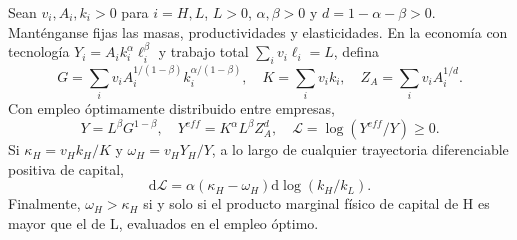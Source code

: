 \begin{lemma}
\label{lem:allocation_loss_identity}
Sean $v_i,A_i,k_i>0$ para $i=H,L$, $L>0$,
$\alpha,\beta>0$ y $d=1-\alpha-\beta>0$.
Manténganse fijas las masas, productividades y elasticidades.
En la economía con tecnología
$Y_i=A_i k_i^\alpha\ell_i^\beta$ y
trabajo total $\sum_i v_i\ell_i=L$, defina
\[
G=\sum_i v_i A_i^{1/(1-\beta)}
k_i^{\alpha/(1-\beta)},\quad
K=\sum_i v_i k_i,\quad Z_A=\sum_i v_iA_i^{1/d}.
\]
Con empleo óptimamente distribuido entre empresas,
\[
Y=L^\beta G^{1-\beta},\quad
Y^{eff}=K^\alpha L^\beta Z_A^d,\quad
\mathscr L=\log(Y^{eff}/Y)\geq0.
\]
Si $\kappa_H=v_Hk_H/K$ y
$\omega_H=v_HY_H/Y$, a lo largo de cualquier
trayectoria diferenciable positiva de capital,
\[
\mathrm d\mathscr L=
\alpha(\kappa_H-\omega_H)
\mathrm d\log(k_H/k_L).
\]
Finalmente, $\omega_H>\kappa_H$ si y solo si el
producto marginal físico de capital de H es
mayor que el de L, evaluados en el empleo óptimo.
\end{lemma}
